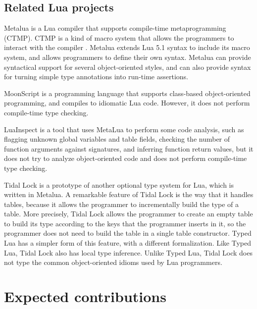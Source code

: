 \documentclass[preprint]{sig-alternate}
\begin{document}
\subsection{Related Lua projects}

Metalua \citep{metalua} is a Lua compiler that supports compile-time
metaprogramming (CTMP).
CTMP is a kind of macro system that allows the programmers to interact
with the compiler \citep{fleutot2007contrasting}. 
Metalua extends Lua 5.1 syntax to include its macro system,
and allows programmers to define their own syntax.
Metalua can provide syntactical support for several object-oriented
styles, and can also provide syntax for turning simple type
annotations into run-time assertions.

MoonScript \citep{moonscript} is a programming language that supports
class-based object-oriented programming, and compiles to idiomatic
Lua code.
However, it does not perform compile-time type checking.

LuaInspect \citep{luainspect} is a tool that uses MetaLua to perform
some code analysis, such as flagging unknown global variables and
table fields, checking the number of function arguments against
signatures, and inferring function return values, but it does not
try to analyze object-oriented code and does not perform compile-time
type checking.

Tidal Lock \citep{tidallock} is a prototype of another optional type
system for Lua, which is written in Metalua.
A remarkable feature of Tidal Lock is the way that it handles tables,
because it allows the programmer to incrementally build the type of
a table.
More precisely, Tidal Lock allows the programmer to create an empty
table to build its type according to the keys that the programmer
inserts in it, so the programmer does not need to build the table in
a single table constructor.
Typed Lua has a simpler form of this feature, with a different
formalization.
Like Typed Lua, Tidal Lock also has local type inference.
Unlike Typed Lua, Tidal Lock does not type the common object-oriented
idioms used by Lua programmers.

\section{Expected contributions} \label{sec:con}
\end{document}
